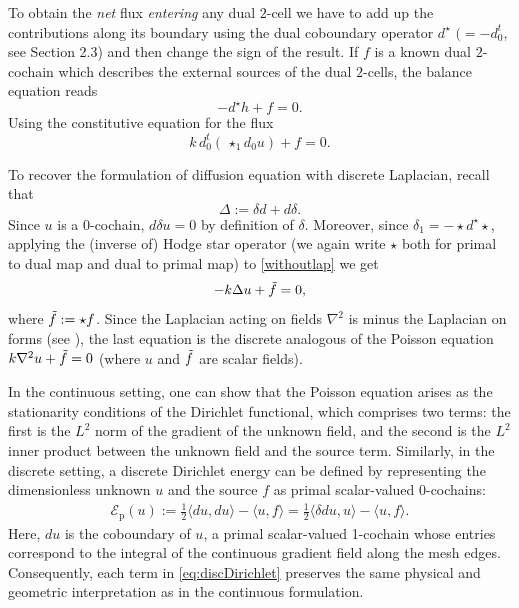 \documentclass{article}
\theoremstyle{definition} %
\theoremstyle{plain} %
\theoremstyle{remark} %
\begin{document}
To obtain the \textit{net} flux \textit{entering} any dual $2$-cell we have to add up the contributions along its boundary using the dual coboundary operator $d^\star$ $(= -d^t_0$, see Section 2.3) and then change the sign of the result. If $f$ is a known dual $2$-cochain which describes the external sources of the dual $2$-cells, the balance equation reads
\begin{equation}
    -d^\star h + f = 0.
\end{equation}
Using the constitutive equation for the flux
\begin{equation}
     k \, d^t_0 (\, \star_1 d_0 u) + f = 0. \label{withoutlap}
\end{equation}

To recover the formulation of diffusion equation with discrete Laplacian, recall that
\begin{equation}
    \Delta := \delta d + d\delta.
\end{equation}
Since $u$ is a $0$-cochain, $d \delta u = 0$ by definition of $\delta$. Moreover, since $\delta_1 = - \star d^\star \star$, applying the (inverse of) Hodge star operator (we again write $\star$ both for primal to dual map and dual to primal map) to \eqref{withoutlap} we get 
\begin{equation}
    -k \Delta u + \Tilde{f} = 0,
\end{equation}
where $\Tilde{f} := \star f$. Since the Laplacian acting on fields $\nabla^2$ is minus the Laplacian on forms (see \cite{frankel2011geometry}), the last equation is the discrete analogous of the Poisson equation $k\nabla ^ 2 u + \Tilde{f} = 0 $ (where $u$ and $\Tilde{f}$ are scalar fields).

In the continuous setting, one can show \cite{evans2010partial} that the Poisson equation arises as the stationarity conditions of the Dirichlet functional, which comprises two terms: the first is the $L^2$ norm of the gradient of the unknown field, and the second is the  $L^2$ inner product between the unknown field and the source term. Similarly, in the discrete setting, a discrete Dirichlet energy can be defined by representing the dimensionless unknown $u$ and the source $f$ as primal scalar-valued $0$-cochains: 
\begin{align}
\mathcal{E}_{\text{p}}(u) := \frac{1}{2} \langle du, du \rangle - \langle u, f \rangle = \frac{1}{2} \langle \delta du, u \rangle - \langle u, f \rangle. \label{eq:discDirichlet}
\end{align}
Here, $du$ is the coboundary of $u$, a primal scalar-valued 1-cochain whose entries correspond to the integral of the continuous gradient field along the mesh edges. Consequently, each term in \eqref{eq:discDirichlet} preserves the same physical and geometric interpretation as in the continuous formulation.
\end{document}

